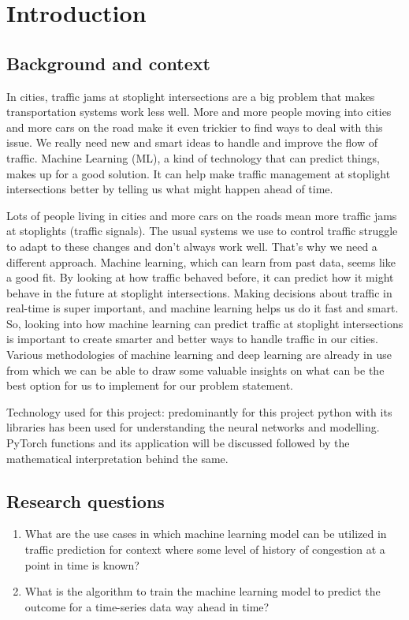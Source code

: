 \chapter{Introduction}

\section{Background and context}

In cities, traffic jams at stoplight intersections are a big problem that makes transportation systems work less well. More and more people moving into cities and more cars on the road make it even trickier to find ways to deal with this issue. We really need new and smart ideas to handle and improve the flow of traffic. Machine Learning (ML), a kind of technology that can predict things, makes up for a good solution. It can help make traffic management at stoplight intersections better by telling us what might happen ahead of time. 

Lots of people living in cities and more cars on the roads mean more traffic jams at stoplights (traffic signals). The usual systems we use to control traffic struggle to adapt to these changes and don't always work well. That's why we need a different approach. Machine learning, which can learn from past data, seems like a good fit. By looking at how traffic behaved before, it can predict how it might behave in the future at stoplight intersections. Making decisions about traffic in real-time is super important, and machine learning helps us do it fast and smart. So, looking into how machine learning can predict traffic at stoplight intersections is important to create smarter and better ways to handle traffic in our cities. Various methodologies of machine learning and deep learning are already in use from which we can be able to draw some valuable insights on what can be the best option for us to implement for our problem statement.

Technology used for this project: predominantly for this project python with its libraries has been used for understanding the neural networks and modelling. PyTorch functions and its application will be discussed followed by the mathematical interpretation behind the same.
\clearpage
\section{Research questions}

\begin{enumerate}[label=\textbf{RQ\arabic*:}]
    \item What are the use cases in which machine learning model can be utilized in traffic prediction for context where some level of history of congestion at a point in time is known?
   
   
    
    \item What is the algorithm to train the machine learning model to predict the outcome for a time-series data way ahead in time?

  \end{enumerate}
